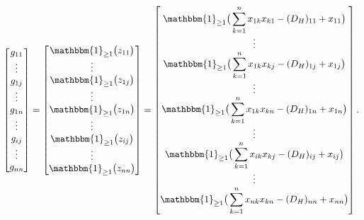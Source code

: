 \documentclass[10pt]{beamer}
\begin{document}
\begin{frame}
    \scriptsize
    \begin{equation}  \label{eq::fund_programming_equation}
        \begin{bmatrix}
        g_{11} \\
        \vdots \\
        g_{1j} \\
        \vdots \\
        g_{1n} \\
        \vdots \\
        g_{ij} \\
        \vdots \\
        g_{nn}
        \end{bmatrix} 
        =
        \begin{bmatrix}
        \mathbbm{1}_{\geq 1}\big(z_{11}\big) \\
        \vdots \\
        \mathbbm{1}_{\geq 1}\big(z_{1j}\big) \\
        \vdots \\
        \mathbbm{1}_{\geq 1}\big(z_{1n}\big) \\
        \vdots \\
        \mathbbm{1}_{\geq 1}\big(z_{ij}\big) \\
        \vdots \\
        \mathbbm{1}_{\geq 1}\big(z_{nn}\big)
        \end{bmatrix}
        =
        \begin{bmatrix} \displaystyle
        \mathbbm{1}_{\geq 1}\big(\sum_{k=1}^n x_{1k}x_{k1} - (D_H)_{11} + x_{11} \big) \\
        \vdots \\ \displaystyle
        \mathbbm{1}_{\geq 1}\big(\sum_{k=1}^n x_{1k}x_{kj} - (D_H)_{1j} + x_{1j} \big) \\
        \vdots \\ \displaystyle
        \mathbbm{1}_{\geq 1}\big(\sum_{k=1}^n x_{1k}x_{kn} - (D_H)_{1n} + x_{1n} \big)\\
        \vdots \\ \displaystyle
        \mathbbm{1}_{\geq 1}\big(\sum_{k=1}^n x_{ik}x_{kj} - (D_H)_{ij} + x_{ij} \big)\\
        \vdots \\ \displaystyle
        \mathbbm{1}_{\geq 1}\big(\sum_{k=1}^n x_{nk}x_{kn} - (D_H)_{nn} + x_{nn} \big)
        \end{bmatrix}.
    \end{equation}
\end{frame}
\end{document}
